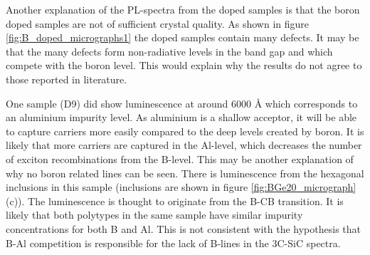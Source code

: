 Another explanation of the PL-spectra from the doped samples is that the boron doped samples are not of sufficient crystal quality. As shown in figure \ref{fig:B_doped_micrographs1} the doped samples contain many defects. It may be that the many defects form non-radiative levels in the band gap and which compete with the boron level. This would explain why the results do not agree to those reported in literature. 

One sample (D9) did show luminescence at around 6000 Å which corresponds to an aluminium impurity level. As aluminium is a shallow acceptor, it will be able to capture carriers more easily compared to the deep levels created by boron. It is likely that more carriers are captured in the Al-level, which decreases the number of exciton recombinations from the B-level. This may be another explanation of why no boron related lines can be seen. There is luminescence from the hexagonal inclusions in this sample (inclusions are shown in figure \ref{fig:BGe20_micrograph} (c)). The luminescence is thought to originate from the B-CB transition. It is likely that both polytypes in the same sample have similar impurity concentrations for both B and Al. This is not consistent with the hypothesis that B-Al competition is responsible for the lack of B-lines in the 3C-SiC spectra. 













































